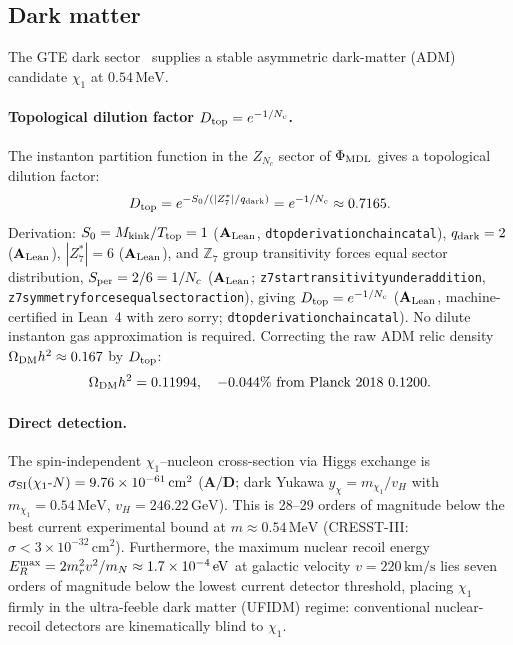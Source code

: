 \documentclass[11pt]{article}
\theoremstyle{remark}
\newcommand{\lean}[1]{%
  \penalty-100
  \begingroup\def\_{\textunderscore\allowbreak}\texttt{#1}\endgroup}
\newcommand{\CatAL}{\ensuremath{\textbf{A}_{\rm Lean}}}
\newcommand{\CatAD}{\textbf{A/D}}
\begin{document}
\subsection{Dark matter}
\label{sec:dm}

The GTE dark sector~\cite{SpivackMirrorBraidAtlas} supplies a stable asymmetric
dark-matter (ADM) candidate $\chi_1$ at $0.54\,\text{MeV}$.

\paragraph{Topological dilution factor $D_{\rm top} = e^{-1/N_c}$.}
The instanton partition function in the $Z_{N_c}$ sector of $\Phi_{\rm MDL}$
gives a topological dilution factor:
\begin{equation}
  D_{\rm top} = e^{-S_0/(|Z_7^*|/q_{\rm dark})} = e^{-1/N_c} \approx 0.7165.
\end{equation}
Derivation: $S_0 = M_{\rm kink}/T_{\rm top} = 1$ (\CatAL, \lean{d\_top\_derivation\allowbreak\_chain\_catal}),
$q_{\rm dark} = 2$ (\CatAL), $|Z_7^*| = 6$ (\CatAL),
and $\mathbb{Z}_7$ group transitivity forces equal sector distribution,
$S_{\rm per} = 2/6 = 1/N_c$
(\CatAL; \lean{z7\_star\_transitivity\_under\_addition},
\lean{z7\_symmetry\_forces\_equal\_sector\_action}),
giving $D_{\rm top} = e^{-1/N_c}$ (\CatAL, machine-certified in Lean~4 with zero sorry;
\lean{d\_top\_derivation\_chain\_catal}).
No dilute instanton gas approximation is required.
Correcting the raw ADM relic density $\Omega_{\rm DM}h^2 \approx 0.167$ by $D_{\rm top}$:
\begin{equation}
  \Omega_{\rm DM}h^2 = 0.11994, \quad -0.044\%\ \text{from Planck~2018}\ 0.1200.
\end{equation}

\paragraph{Direct detection.}
The spin-independent $\chi_1$--nucleon cross-section via Higgs exchange is
$\sigma_{\rm SI}(\chi_1\text{-}N) = 9.76\times10^{-61}\,\mathrm{cm}^2$ ($\CatAD$;
dark Yukawa $y_\chi = m_{\chi_1}/v_H$ with $m_{\chi_1} = 0.54\,\text{MeV}$,
$v_H = 246.22\,\text{GeV}$).
This is 28--29 orders of magnitude below the best current experimental
bound at $m \approx 0.54\,\text{MeV}$ (CRESST-III: $\sigma < 3\times10^{-32}\,\mathrm{cm}^2$).
Furthermore, the maximum nuclear recoil energy
$E_R^{\rm max} = 2m_r^2 v^2/m_N \approx 1.7\times10^{-4}\,\mathrm{eV}$
at galactic velocity $v = 220\,\mathrm{km/s}$ lies seven orders of magnitude below the lowest
current detector threshold, placing $\chi_1$ firmly in the ultra-feeble dark matter (UFIDM) regime:
conventional nuclear-recoil detectors are kinematically blind to $\chi_1$.
\end{document}
